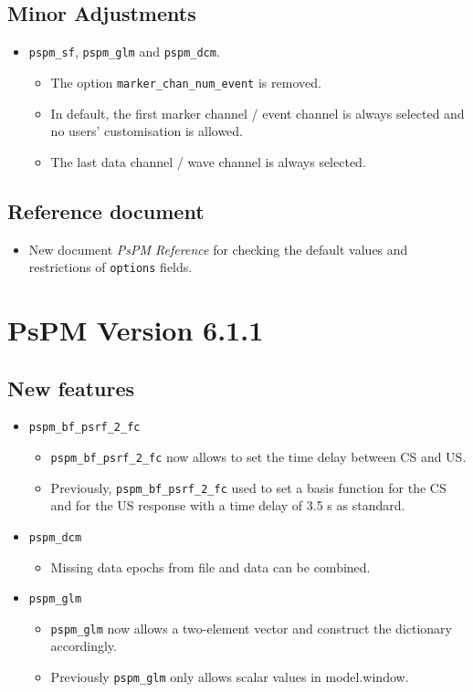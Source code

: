 \documentclass[english]{article}
\numberwithin{equation}{section}
\numberwithin{figure}{section}
\begin{document}
\subsection*{Minor Adjustments}
    \begin{itemize}
    	\item \texttt{pspm\_sf}, \texttt{pspm\_glm} and \texttt{pspm\_dcm}.
    	\begin{itemize}
    		\item The option \texttt{marker\_chan\_num\_event} is removed.
    		\item In default, the first marker channel / event channel is always selected and 
    					no users' customisation is allowed.
    		\item The last data channel / wave channel is always selected.
    	\end{itemize}
    \end{itemize}
\subsection*{Reference document}
    \begin{itemize}
    	\item New document \textit{PsPM Reference} for checking the default values and 
    				restrictions of \texttt{options} fields.
    \end{itemize}

\section{PsPM Version 6.1.1}

\subsection*{New features}
\begin{itemize}
\item \texttt{pspm\_bf\_psrf\_2\_fc}
\begin{itemize}
\item \texttt{pspm\_bf\_psrf\_2\_fc} now allows to set the time delay between
CS and US.
\item Previously, \texttt{pspm\_bf\_psrf\_2\_fc} used to set a basis function
for the CS and for the US response with a time delay of 3.5 s as standard.
\end{itemize}
\item \texttt{pspm\_dcm}
\begin{itemize}
\item Missing data epochs from file and data can be combined.
\end{itemize}
\item \texttt{pspm\_glm}
\begin{itemize}
\item \texttt{pspm\_glm} now allows a two-element vector and construct the
dictionary accordingly.
\item Previously \texttt{pspm\_glm} only allows scalar values in model.window.
\end{itemize}
\end{itemize}
\end{document}
